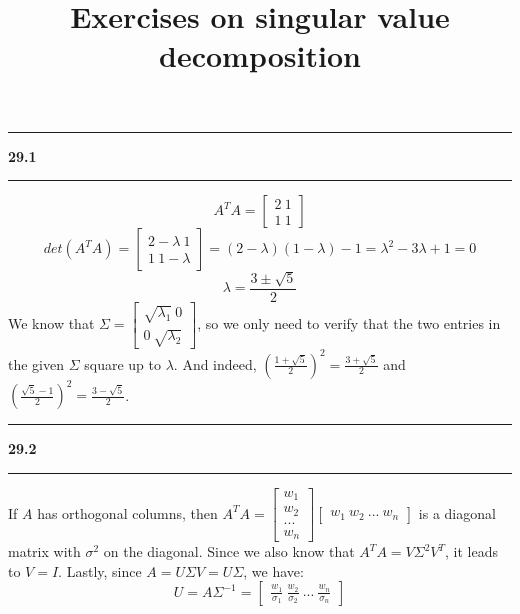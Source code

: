\documentclass[11pt]{article}
\newcommand\question[2]{\vspace{.25in}\hrule\textbf{#1 #2}\vspace{.5em}\hrule\vspace{.10in}}
\begin{document}
\raggedright
\newcommand\NAME{Haiying Cui}  %
\newcommand\ANDREWID{Christy}     %
\newcommand\HWNUM{29}              %

\title{Exercises on singular value decomposition}
\maketitle

\question{29.1}{}
$$A^TA = \begin{bmatrix} 2 \ 1 \\ 1 \ 1 \end{bmatrix}$$
$$det(A^TA )= \begin{bmatrix} 2-\lambda \ 1 \\ 1 \ 1-\lambda \end{bmatrix} = (2-\lambda)(1-\lambda)-1 = \lambda^2 -3\lambda +1 = 0$$
$$\lambda = \frac{3\pm \sqrt{5}}{2}$$
We know that \(\Sigma = \begin{bmatrix} \sqrt{\lambda_1} \ 0 \\ 0 \ \sqrt{\lambda_2} \end{bmatrix}\), so we only need to verify that the two entries in the given \(\Sigma\) square up to \(\lambda\). And indeed, \((\frac{1+\sqrt{5}}{2})^2 = \frac{3+\sqrt{5}}{2}\) and \((\frac{\sqrt{5}-1}{2})^2 = \frac{3-\sqrt{5}}{2}\).

\question{29.2}{}
If \(A\) has orthogonal columns, then \(A^TA = \begin{bmatrix} w_1 \\ w_2 \\ ... \\ w_n \end{bmatrix}\begin{bmatrix} w_1 \ w_2 \ ... \ w_n \end{bmatrix}\) is a diagonal matrix with \(\sigma^2\) on the diagonal. Since we also know that \(A^TA = V\Sigma^2V^T\), it leads to \(V = I\). Lastly, since \(A = U\Sigma V = U\Sigma\), we have:
$$U = A\Sigma^{-1} = \begin{bmatrix} \frac{w_1}{\sigma_1} \ \frac{w_2}{\sigma_2} \ ... \ \frac{w_n}{\sigma_n} \end{bmatrix}$$
\end{document}
